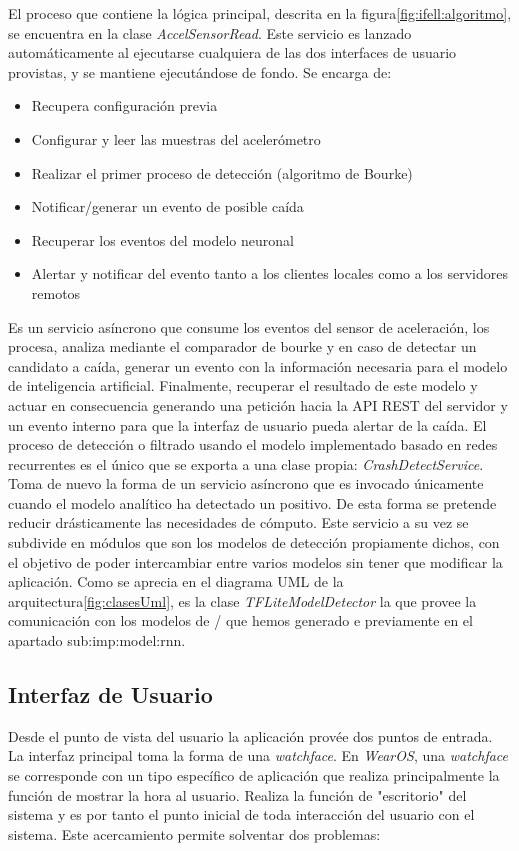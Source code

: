 
El proceso que contiene la lógica principal, descrita en la figura\ref{fig:ifell:algoritmo}, se encuentra en la clase \textit{AccelSensorRead}. Este servicio es lanzado automáticamente al ejecutarse cualquiera de las dos interfaces de usuario provistas, y se mantiene ejecutándose de fondo. Se encarga de:

\begin{itemize}
  \item Recupera configuración previa
  \item Configurar y leer las muestras del acelerómetro
  \item Realizar el primer proceso de detección (algoritmo de Bourke)
  \item Notificar/generar un evento de posible caída
  \item Recuperar los eventos del modelo neuronal
  \item Alertar y notificar del evento tanto a los clientes locales como a los servidores remotos
\end{itemize}


Es un servicio asíncrono que consume los eventos del sensor de aceleración, los procesa, analiza mediante el comparador de bourke y en caso de detectar un candidato a caída, generar un evento con la información necesaria para el modelo de inteligencia artificial. Finalmente, recuperar el resultado de este modelo y actuar en consecuencia generando una petición hacia la API REST del servidor y un evento interno para que la interfaz de usuario pueda alertar de la caída.
El proceso de detección o filtrado usando el modelo implementado basado en redes recurrentes es el único que se exporta a una clase propia: \textit{CrashDetectService}. Toma de nuevo la forma de un servicio asíncrono que es invocado únicamente cuando el modelo analítico ha detectado un positivo. De esta forma se pretende reducir drásticamente las necesidades de cómputo. Este servicio a su vez se subdivide en módulos que son los modelos de detección propiamente dichos, con el objetivo de poder intercambiar entre varios modelos sin tener que modificar la aplicación. Como se aprecia en el diagrama UML de la arquitectura\ref{fig:clasesUml}, es la clase \textit{TFLiteModelDetector} la que provee la comunicación con los modelos de \tflite/ que hemos generado e previamente en el apartado \refname{sub:imp:model:rnn}. 


\subsection{Interfaz de Usuario}
Desde el punto de vista del usuario la aplicación provée dos puntos de entrada. La interfaz principal toma la forma de una \textit{watchface}. En \textit{WearOS}, una \textit{watchface} se corresponde con un tipo específico de aplicación que realiza principalmente la función de mostrar la hora al usuario. Realiza la función de "escritorio" del sistema y es por tanto el punto inicial de toda interacción del usuario con el sistema. Este acercamiento permite solventar dos problemas:

